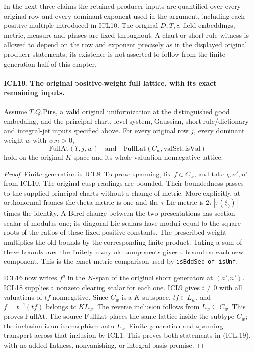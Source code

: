 In the next three claims the retained producer inputs are
quantified over every original row and every dominant
exponent used in the argument, including each positive
multiple introduced in ICL10.  The original \(D,T,c\),
field embeddings, metric, measure and phases are fixed
throughout.  A chart or short-rule witness is allowed to
depend on the row and exponent precisely as in the
displayed original producer statements; its existence
is not asserted to follow from the finite-generation
half of this chapter.

\paragraph{ICL19. The original positive-weight full lattice, with its exact remaining inputs.}
\label{claim:ICL19}
Assume \(T.Q.\mathrm{Pins}\), a valid original
uniformization at the distinguished good embedding,
and the principal-chart, level-system, Gaussian,
short-rule/dictionary and integral-jet inputs specified
above.  For every original row \(j\), every dominant
weight \(w\) with \(w.n>0\),
\[
 \mathrm{FullAt}(T,j,w)
 \quad\text{and}\quad
 \mathrm{FullLat}(C_w,\mathrm{valSet},\mathrm{isVal})
                                                               \tag{ICL.19}
\]
hold on the original \(K\)-space and its whole
valuation-nonnegative lattice.
\begin{proof}
Finite generation is ICL8.  To prove spanning, fix
\(f\in C_w\), and take \(q,a',n'\) from ICL10.
The original cusp readings are bounded.  Their
boundedness passes to the supplied principal charts
without a change of metric.  More explicitly, at
orthonormal frames the theta metric is one and the
\(\tau\)-Lie metric is
\(2\pi|\tau(\xi_0)|\) times the identity.  A Borel
change between the two presentations has section
scalar of modulus one; its diagonal Lie scalars
have moduli equal to the square roots of the ratios
of these fixed positive constants.  The prescribed
weight multiplies the old bounds by the corresponding
finite product.  Taking a sum of these bounds over
the finitely many old components gives a bound on
each new component.  This is the exact metric
comparison used by \texttt{isBddSec\_of\_isUnf}.

ICL16 now writes \(f^q\) in the \(K\)-span of
the original short generators at \((a',n')\).
ICL18 supplies a nonzero clearing scalar for each
one.  ICL9 gives \(t\ne0\) with all valuations
of \(tf\) nonnegative.  Since \(C_w\) is a
\(K\)-subspace, \(tf\in L_w\), and
\(f=t^{-1}(tf)\) belongs to \(K L_w\).  The
reverse inclusion follows from \(L_w\subseteq C_w\).
This proves \(\mathrm{FullAt}\).  The source
\(\mathrm{FullLat}\) places the same lattice inside
the subtype \(C_w\); the inclusion is an isomorphism
onto \(L_w\).  Finite generation and spanning
transport across that inclusion by ICL1.  This
proves both statements in (ICL.19), with no added
flatness, nonvanishing, or integral-basis premise.
\end{proof}

